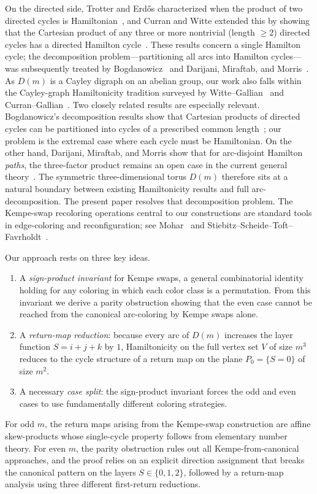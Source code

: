 \documentclass[11pt]{article}
\begin{document}
On the directed side, Trotter and Erd\H{o}s characterized when the product of two directed cycles is Hamiltonian~\cite{TrotterErdos1978}, and Curran and Witte extended this by showing that the Cartesian product of any three or more nontrivial (length $\ge 2$) directed cycles has a directed Hamilton cycle~\cite{CurranWitte1985}.
These results concern a single Hamilton cycle; the decomposition problem---partitioning all arcs into Hamilton cycles---was subsequently treated by Bogdanowicz~\cite{Bogdanowicz2017,Bogdanowicz2020} and Darijani, Miraftab, and Morris~\cite{DarijaniMiraftabMorris2022}.
As $D(m)$ is a Cayley digraph on an abelian group, our work also falls within the Cayley-graph Hamiltonicity tradition surveyed by Witte--Gallian~\cite{WitteGallian1984} and Curran--Gallian~\cite{CurranGallian1996}.
Two closely related results are especially relevant.
Bogdanowicz's decomposition results show that Cartesian products of directed cycles can be partitioned into cycles of a prescribed common length~\cite{Bogdanowicz2017}; our problem is the extremal case where each cycle must be Hamiltonian.
On the other hand, Darijani, Miraftab, and Morris show that for arc-disjoint Hamilton \emph{paths}, the three-factor product remains an open case in the current general theory~\cite{DarijaniMiraftabMorris2022}.
The symmetric three-dimensional torus $D(m)$ therefore sits at a natural boundary between existing Hamiltonicity results and full arc-decomposition.
The present paper resolves that decomposition problem.
The Kempe-swap recoloring operations central to our constructions are standard tools in edge-coloring and reconfiguration; see Mohar~\cite{Mohar2006} and Stiebitz--Scheide--Toft--Favrholdt~\cite{StiebitzEtAl2012}.

Our approach rests on three key ideas.
\begin{enumerate}[label=\textup{(\roman*)},leftmargin=2.5em]
\item A \emph{sign-product invariant} for Kempe swaps, a general combinatorial identity holding for any coloring in which each color class is a permutation.
From this invariant we derive a parity obstruction showing that the even case cannot be reached from the canonical arc-coloring by Kempe swaps alone.
\item A \emph{return-map reduction}: because every arc of $D(m)$ increases the layer function $S=i+j+k$ by $1$, Hamiltonicity on the full vertex set $V$ of size $m^3$ reduces to the cycle structure of a return map on the plane $P_0=\{S=0\}$ of size $m^2$.
\item A necessary \emph{case split}: the sign-product invariant forces the odd and even cases to use fundamentally different coloring strategies.
\end{enumerate}
For odd $m$, the return maps arising from the Kempe-swap construction are affine skew-products whose single-cycle property follows from elementary number theory.
For even $m$, the parity obstruction rules out all Kempe-from-canonical approaches, and the proof relies on an explicit direction assignment that breaks the canonical pattern on the layers $S\in\{0,1,2\}$, followed by a return-map analysis using three different first-return reductions.
\end{document}
